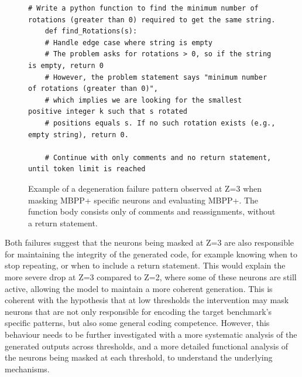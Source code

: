 \documentclass[mscthesis]{usiinfthesis}
\begin{document}
\begin{figure}[H]
\begin{lstlisting}[style=pythonstyle2]
    # Write a python function to find the minimum number of rotations (greater than 0) required to get the same string.
    def find_Rotations(s):
	# Handle edge case where string is empty
	# The problem asks for rotations > 0, so if the string is empty, return 0
	# However, the problem statement says "minimum number of rotations (greater than 0)", 
	# which implies we are looking for the smallest positive integer k such that s rotated
	# positions equals s. If no such rotation exists (e.g., empty string), return 0.
	
    # Continue with only comments and no return statement, until token limit is reached
\end{lstlisting}
\caption{Example of a degeneration failure pattern observed at Z=3 when masking MBPP+ specific neurons and evaluating MBPP+. The function body consists only of comments and reassignments, without a return statement.}
\label{fig:degeneration_example}
\end{figure}
Both failures suggest that the neurons being masked at Z=3 are also responsible for maintaining the integrity of the generated code, for example knowing when to stop repeating, 
or when to include a return statement.
This would explain the more severe drop at Z=3 compared to Z=2, where some of these neurons are still active, allowing the model to maintain a more coherent generation.
This is coherent with the hypothesis that at low thresholds the intervention may mask neurons that are not only responsible for encoding the target benchmark's specific patterns, but 
also some general coding competence.
However, this behaviour needs to be further investigated with a more systematic analysis of the generated outputs across thresholds, and a more detailed functional analysis of the neurons being masked at each threshold, to understand the underlying mechanisms.
\end{document}
